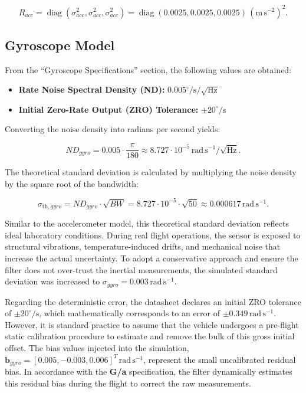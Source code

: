 \documentclass[a4paper,twoside,openany]{report}
\begin{document}
\begin{equation}
    R_{acc} = \operatorname{diag}(\sigma_{acc}^2,\sigma_{acc}^2,\sigma_{acc}^2)
    = \operatorname{diag}(0.0025,0.0025,0.0025)\,\mathrm{(m\,s^{-2})^2}.
\end{equation}

\subsection{Gyroscope Model}

From the ``Gyroscope Specifications'' section, the following values are obtained:

\begin{itemize}
    \item \textbf{Rate Noise Spectral Density (ND):} $0.005^\circ/\mathrm{s}/\sqrt{\mathrm{Hz}}$
    \item \textbf{Initial Zero-Rate Output (ZRO) Tolerance:} $\pm 20^\circ/\mathrm{s}$
\end{itemize}

Converting the noise density into radians per second yields:

\begin{equation}
    ND_{gyro} = 0.005 \cdot \frac{\pi}{180} \approx 8.727 \cdot 10^{-5}\,\mathrm{rad\,s^{-1}/\sqrt{Hz}}.
\end{equation}

The theoretical standard deviation is calculated by multiplying the noise density by the square root of the bandwidth:

\begin{equation}
    \sigma_{\mathrm{th},gyro} = ND_{gyro} \cdot \sqrt{BW} = 8.727 \cdot 10^{-5} \cdot \sqrt{50} \approx 0.000617\,\mathrm{rad\,s^{-1}}.
\end{equation}

Similar to the accelerometer model, this theoretical standard deviation reflects ideal laboratory conditions. During real flight operations, the sensor is exposed to structural vibrations, temperature-induced drifts, and mechanical noise that increase the actual uncertainty. To adopt a conservative approach and ensure the filter does not over-trust the inertial measurements, the simulated standard deviation was increased to $\sigma_{gyro} = 0.003\,\mathrm{rad\,s^{-1}}$.

Regarding the deterministic error, the datasheet declares an initial ZRO tolerance of $\pm 20^\circ/\mathrm{s}$, which mathematically corresponds to an error of $\pm 0.349\,\mathrm{rad\,s^{-1}}$. However, it is standard practice to assume that the vehicle undergoes a pre-flight static calibration procedure to estimate and remove the bulk of this gross initial offset. The bias values injected into the simulation, $\mathbf{b}_{gyro} = [0.005, -0.003, 0.006]^T\,\mathrm{rad\,s^{-1}}$, represent the small uncalibrated residual bias. In accordance with the \textbf{G/a} specification, the filter dynamically estimates this residual bias during the flight to correct the raw measurements.
\end{document}
